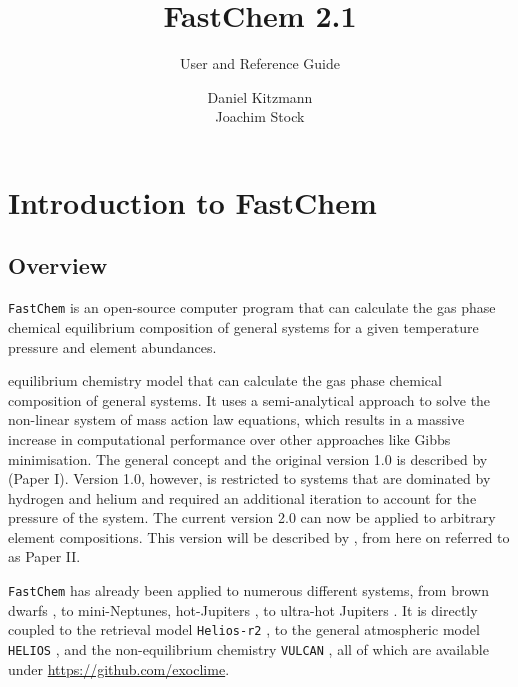 \documentclass[numbers=noenddot]{aux/fcmanual}
\author{Daniel Kitzmann\\
	    Joachim Stock
}
\title{FastChem 2.1}
\subtitle{User and Reference Guide}
\date{}
\newcommand{\fc}{\texttt{FastChem}\xspace}
\newcommand{\ttt}[1]{\texttt {#1}}
\begin{document}
\maketitle


\tableofcontents

\chapter{Introduction to FastChem}

\section{Overview}

\fc is an open-source computer program that can calculate the gas phase chemical equilibrium composition of general systems for a given temperature pressure and element abundances.


equilibrium chemistry model that can calculate the gas phase chemical composition of general systems. It uses a semi-analytical approach to solve the non-linear system of mass action law equations, which results in a massive increase in computational performance over other approaches like Gibbs minimisation. The general concept and the original version 1.0 is described by \citet{Stock2018MNRAS.479..865S} (Paper I). Version 1.0, however, is restricted to systems that are dominated by hydrogen and helium and required an additional iteration to account for the pressure of the system. The current version 2.0 can now be applied to arbitrary element compositions. This version will be described by \citet{Stock2020inprep}, from here on referred to as Paper II.

\fc has already been applied to numerous different systems, from brown dwarfs \citep{Kitzmann2020ApJ...890..174K}, to mini-Neptunes, hot-Jupiters \citep{Bourrier2020A&A...637A..36B}, to ultra-hot Jupiters \citep{Hoeijmakers2019A&A...627A.165H}. It is directly coupled to the retrieval model \ttt{Helios-r2} \citep{Kitzmann2020ApJ...890..174K}, to the general atmospheric model \ttt{HELIOS} \citep{Malik2019AJ....157..170M}, and the non-equilibrium chemistry \ttt{VULCAN} \citep{Tsai2018ApJ...862...31T}, all of which are available under \url{https://github.com/exoclime}.


%
\end{document}
